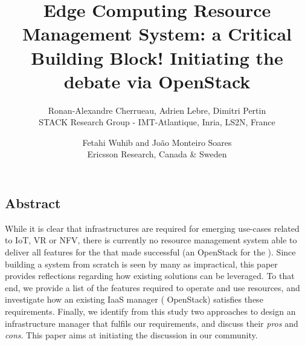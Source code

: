 \documentclass[letterpaper,twocolumn,10pt]{article}
\begin{document}
\date{}

\title{\Large \bf Edge Computing Resource Management System: a Critical
Building Block! Initiating the debate via OpenStack}

\author{
{\rm Ronan-Alexandre Cherrueau, Adrien Lebre, Dimitri Pertin}\\
STACK Research Group - IMT-Atlantique, Inria, LS2N, France
\and
{\rm Fetahi Wuhib and  João Monteiro Soares}\\
Ericsson Research, Canada \& Sweden\\
} %

\maketitle

\thispagestyle{empty}


\subsection*{Abstract}
While it is clear that \edge infrastructures are required for emerging
use-cases related to IoT, VR or NFV, there is currently no resource management
system able to deliver all features for the \edge that made \cloudcomputing successful
(\eg an OpenStack for the \edge).
%
Since building a system from scratch is seen by many as impractical,
this paper provides reflections regarding how existing solutions can be leveraged.
%
To that end, we provide a list of the features required to operate and use
\edgecomputing resources, and investigate how an existing IaaS manager (\ie
OpenStack) satisfies these requirements. Finally, we identify from this study two
approaches to design an \edge infrastructure manager that fulfils our
requirements, and discuss their \emph{pros} and \emph{cons}. This paper aims at
initiating the discussion in our community. 

\end{document}
